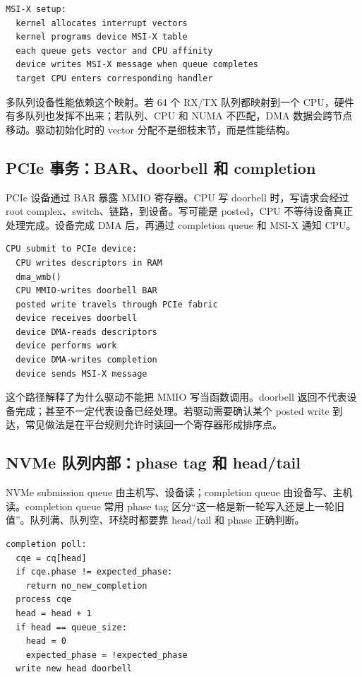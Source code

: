 \begin{lstlisting}
MSI-X setup:
  kernel allocates interrupt vectors
  kernel programs device MSI-X table
  each queue gets vector and CPU affinity
  device writes MSI-X message when queue completes
  target CPU enters corresponding handler
\end{lstlisting}

多队列设备性能依赖这个映射。若 64 个 RX/TX 队列都映射到一个 CPU，硬件有多队列也发挥不出来；若队列、CPU 和 NUMA 不匹配，DMA 数据会跨节点移动。驱动初始化时的 vector 分配不是细枝末节，而是性能结构。

\subsection{PCIe 事务：BAR、doorbell 和 completion}

PCIe 设备通过 BAR 暴露 MMIO 寄存器。CPU 写 doorbell 时，写请求会经过 root complex、switch、链路，到设备。写可能是 posted，CPU 不等待设备真正处理完成。设备完成 DMA 后，再通过 completion queue 和 MSI-X 通知 CPU。

\begin{lstlisting}
CPU submit to PCIe device:
  CPU writes descriptors in RAM
  dma_wmb()
  CPU MMIO-writes doorbell BAR
  posted write travels through PCIe fabric
  device receives doorbell
  device DMA-reads descriptors
  device performs work
  device DMA-writes completion
  device sends MSI-X message
\end{lstlisting}

这个路径解释了为什么驱动不能把 MMIO 写当函数调用。doorbell 返回不代表设备完成；甚至不一定代表设备已经处理。若驱动需要确认某个 posted write 到达，常见做法是在平台规则允许时读回一个寄存器形成排序点。

\subsection{NVMe 队列内部：phase tag 和 head/tail}

NVMe submission queue 由主机写、设备读；completion queue 由设备写、主机读。completion queue 常用 phase tag 区分“这一格是新一轮写入还是上一轮旧值”。队列满、队列空、环绕时都要靠 head/tail 和 phase 正确判断。

\begin{lstlisting}
completion poll:
  cqe = cq[head]
  if cqe.phase != expected_phase:
    return no_new_completion
  process cqe
  head = head + 1
  if head == queue_size:
    head = 0
    expected_phase = !expected_phase
  write new head doorbell
\end{lstlisting}

